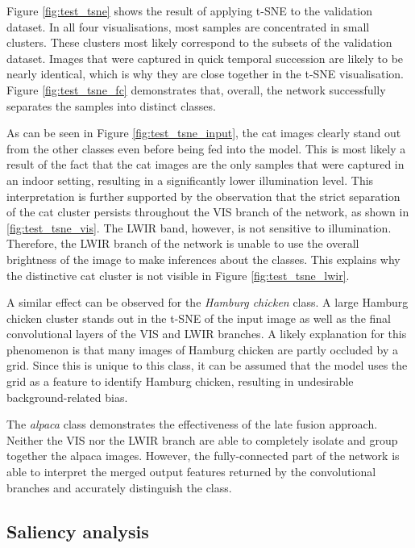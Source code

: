 \documentclass{l4proj}
\begin{document}
Figure \ref{fig:test_tsne} shows the result of applying t-SNE to the validation dataset. In all four visualisations, most samples are concentrated in small clusters. These clusters most likely correspond to the subsets of the validation dataset. Images that were captured in quick temporal succession are likely to be nearly identical, which is why they are close together in the t-SNE visualisation. Figure \ref{fig:test_tsne_fc} demonstrates that, overall, the network successfully separates the samples into distinct classes.

As can be seen in Figure \ref{fig:test_tsne_input}, the cat images clearly stand out from the other classes even before being fed into the model. This is most likely a result of the fact that the cat images are the only samples that were captured in an indoor setting, resulting in a significantly lower illumination level. This interpretation is further supported by the observation that the strict separation of the cat cluster persists throughout the VIS branch of the network, as shown in \ref{fig:test_tsne_vis}. The LWIR band, however, is not sensitive to illumination. Therefore, the LWIR branch of the network is unable to use the overall brightness of the image to make inferences about the classes. This explains why the distinctive cat cluster is not visible in Figure \ref{fig:test_tsne_lwir}.

A similar effect can be observed for the \textit{Hamburg chicken} class. A large Hamburg chicken cluster stands out in the t-SNE of the input image as well as the final convolutional layers of the VIS and LWIR branches. A likely explanation for this phenomenon is that many images of Hamburg chicken are partly occluded by a grid. Since this is unique to this class, it can be assumed that the model uses the grid as a feature to identify Hamburg chicken, resulting in undesirable background-related bias.

The \textit{alpaca} class demonstrates the effectiveness of the late fusion approach. Neither the VIS nor the LWIR branch are able to completely isolate and group together the alpaca images. However, the fully-connected part of the network is able to interpret the merged output features returned by the convolutional branches and accurately distinguish the class.

\subsection{Saliency analysis}
\end{document}
